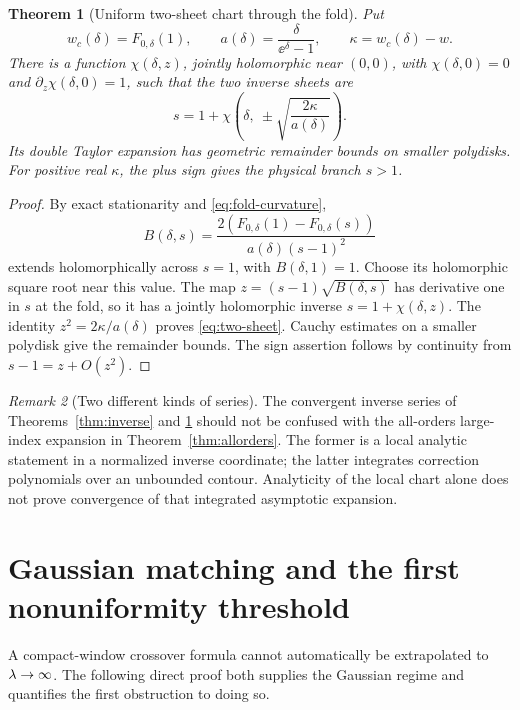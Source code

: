 \documentclass[11pt,a4paper]{article}
\numberwithin{equation}{section}
\newtheorem{theorem}{Theorem}[section]
\theoremstyle{definition}
\theoremstyle{remark}
\newtheorem{remark}[theorem]{Remark}
\begin{document}
\begin{theorem}[Uniform two-sheet chart through the fold]\label{thm:two-sheet}
Put
\begin{equation}\label{eq:fold-chart-vars}
 w_c(\delta)=F_{0,\delta}(1),\qquad
 a(\delta)=\frac\delta{\ee^\delta-1},\qquad
 \kappa=w_c(\delta)-w.
\end{equation}
There is a function \(\chi(\delta,z)\), jointly holomorphic near
\((0,0)\), with \(\chi(\delta,0)=0\) and
\(\partial_z\chi(\delta,0)=1\), such that the two inverse sheets are
\begin{equation}\label{eq:two-sheet}
 s=1+\chi\left(\delta,\ \pm\sqrt{\frac{2\kappa}{a(\delta)}}\right).
\end{equation}
Its double Taylor expansion has geometric remainder bounds on smaller
polydisks. For positive real \(\kappa\), the plus sign gives the physical
branch \(s>1\).
\end{theorem}
\begin{proof}
By exact stationarity and \eqref{eq:fold-curvature},
\[
 B(\delta,s)=
 \frac{2(F_{0,\delta}(1)-F_{0,\delta}(s))}
      {a(\delta)(s-1)^2}
\]
extends holomorphically across \(s=1\), with \(B(\delta,1)=1\).
Choose its holomorphic square root near this value. The map
\(z=(s-1)\sqrt{B(\delta,s)}\) has derivative one in \(s\) at the fold,
so it has a jointly holomorphic inverse \(s=1+\chi(\delta,z)\).
The identity \(z^2=2\kappa/a(\delta)\) proves \eqref{eq:two-sheet}.
Cauchy estimates on a smaller polydisk give the remainder bounds.
The sign assertion follows by continuity from \(s-1=z+O(z^2)\).
\end{proof}

\begin{remark}[Two different kinds of series]
The convergent inverse series of Theorems~\ref{thm:inverse} and
\ref{thm:two-sheet} should not be confused with the all-orders
large-index expansion in Theorem~\ref{thm:allorders}. The former is a
local analytic statement in a normalized inverse coordinate; the latter
integrates correction polynomials over an unbounded contour. Analyticity
of the local chart alone does not prove convergence of that integrated
asymptotic expansion.
\end{remark}

\section{Gaussian matching and the first nonuniformity threshold}
\label{sec:matching}
A compact-window crossover formula cannot automatically be extrapolated
to \(\lambda\to\infty\). The following direct proof both supplies the
Gaussian regime and quantifies the first obstruction to doing so.
\end{document}
